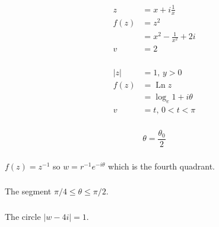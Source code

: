 \documentclass{article}
\newcommand{\Ln}{\operatorname{Ln}}
\begin{document}
\begin{align*}
  z    & = x + i \frac{1}{x}         \\
  f(z) & = z^2                       \\
       & = x^2 - \frac{1}{x^2} + 2 i \\
  v    & = 2
\end{align*}

\setcounter{subsubsection}{4}
\subsubsection{}

\begin{align*}
  |z|  & = 1, \,y > 0          \\
  f(z) & = \Ln z               \\
       & = \log_e 1 + i \theta \\
  v    & = t, \,0 < t < \pi
\end{align*}

\setcounter{subsubsection}{6}
\subsubsection{}

\[\theta = \frac{\theta_0}{2}\]

\setcounter{subsubsection}{10}
\subsubsection{}

$f(z) = z^{-1}$ so $w = r^{-1} e^{-i \theta}$ which is the fourth quadrant.

\setcounter{subsubsection}{12}
\subsubsection{}

The segment $\pi / 4 \le \theta \le \pi / 2$.

\setcounter{subsubsection}{14}
\subsubsection{}

The circle $|w - 4 i| = 1$.

\setcounter{subsubsection}{16}
\subsubsection{}
\end{document}
